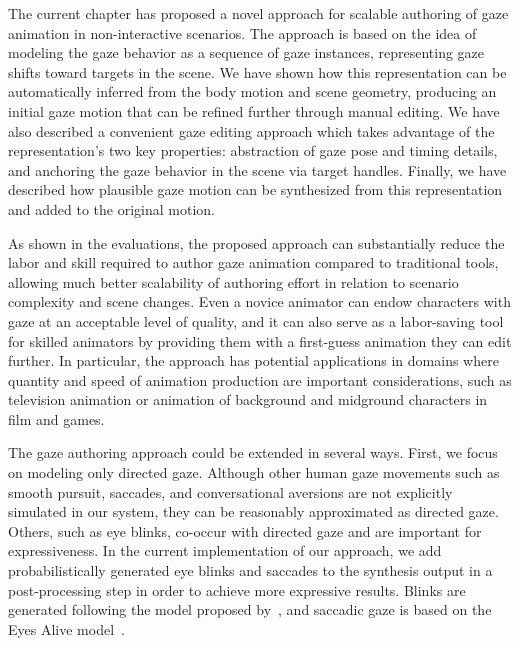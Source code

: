 The current chapter has proposed a novel approach for scalable authoring of gaze animation in non-interactive scenarios. The approach is based on the idea of modeling the gaze behavior as a sequence of gaze instances, representing gaze shifts toward targets in the scene. We have shown how this representation can be automatically inferred from the body motion and scene geometry, producing an initial gaze motion that can be refined further through manual editing. We have also described a convenient gaze editing approach which takes advantage of the representation's two key properties: abstraction of gaze pose and timing details, and anchoring the gaze behavior in the scene via target handles. Finally, we have described how plausible gaze motion can be synthesized from this representation and added to the original motion.

As shown in the evaluations, the proposed approach can substantially reduce the labor and skill required to author gaze animation compared to traditional tools, allowing much better scalability of authoring effort in relation to scenario complexity and scene changes. Even a novice animator can endow characters with gaze at an acceptable level of quality, and it can also serve as a labor-saving tool for skilled animators by providing them with a first-guess animation they can edit further. In particular, the approach has potential applications in domains where quantity and speed of animation production are important considerations, such as television animation or animation of background and midground characters in film and games.

The gaze authoring approach could be extended in several ways.
First, we focus on modeling only directed gaze. Although other human gaze movements such as smooth pursuit, saccades, and conversational aversions are not explicitly simulated in our system, they can be reasonably approximated as directed gaze. Others, such as eye blinks, co-occur with directed gaze and are important for expressiveness.
In the current implementation of our approach, we add probabilistically generated eye blinks and saccades to the synthesis output in a post-processing step in order to achieve more expressive results. Blinks are generated following the model proposed by~\citet{peters2010animating}, and saccadic gaze is based on the Eyes Alive model~\citep{lee2002eyes}.

